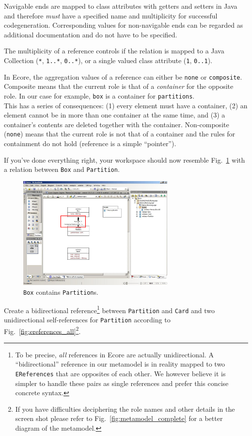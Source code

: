 Navigable ends are mapped to class attributes with getters and setters in Java
and therefore \emph{must} have a specified name and  multiplicity for successful
codegeneration.  
Corresponding values for non-navigable ends can  be regarded as additional
documentation and do not have to be specified.
 
The multiplicity of a reference controls if the relation is mapped to a Java
Collection (\texttt{*},  \texttt{1..*}, \texttt{0..*}), or a single valued class
attribute (\texttt{1}, \texttt{0..1}).

In Ecore, the aggregation values of a reference can either be \texttt{none} or
\texttt{com\-po\-site}.  Composite means that the current role is that of a
\emph{container} for the opposite role.  In our case for example, \texttt{box}
is a container for \texttt{partitions}.\\  This has a series of
consequences: (1) every element must have a container, (2) an element cannot be
in more than one container at the same time, and (3) a container's contents are
deleted together with the container.  Non-composite (\texttt{none}) means that
the current role is not that of a container and the rules for containment do not
hold (reference is a simple ``pointer'').

\clearpage

If you've done everything right, your workspace should now resemble
Fig.~\ref{fig:ereference_completed} with a relation between \texttt{Box} and
\texttt{Partition}.

\begin{figure}[htbp] 
	\centering
  \includegraphics[width=0.7\textwidth]{pics/memBoxBilder/memBox28.png}
	\caption{\texttt{Box} contains \texttt{Partition}s.}
	\label{fig:ereference_completed}
\end{figure}

Create a bidirectional reference\footnote{To be precise, \emph{all} references
in Ecore are actually unidirectional.  A ``bidirectional'' reference in our
metamodel is in reality mapped to two \texttt{EReferences} that are opposites of
each other.  
We however believe it is simpler to handle these pairs as single references and
prefer this concise concrete syntax.} between \texttt{Partition} and \texttt{Card}
and two unidirectional self-references for \texttt{Partition} according to
Fig.~\ref{fig:ereferences_all}\footnote{If you have difficulties deciphering
the role names and other details in the screen shot please refer to
Fig.~\ref{fig:metamodel_complete} for a better diagram of the metamodel.}.
 
